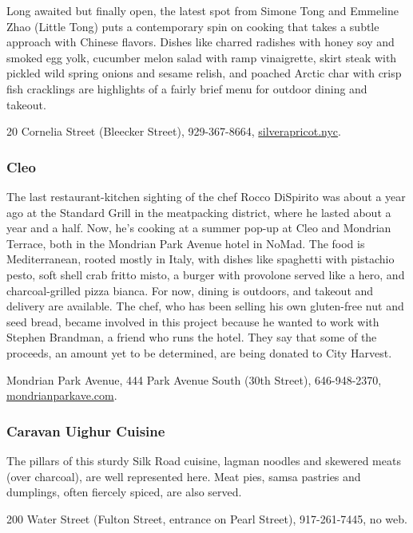 Long awaited but finally open, the latest spot from Simone Tong and
Emmeline Zhao (Little Tong) puts a contemporary spin on cooking that
takes a subtle approach with Chinese flavors. Dishes like charred
radishes with honey soy and smoked egg yolk, cucumber melon salad with
ramp vinaigrette, skirt steak with pickled wild spring onions and sesame
relish, and poached Arctic char with crisp fish cracklings are
highlights of a fairly brief menu for outdoor dining and takeout.

20 Cornelia Street (Bleecker Street), 929-367-8664,
\href{https://www.silverapricot.nyc/}{silverapricot.nyc}.

\hypertarget{cleo}{%
\subsubsection{Cleo}\label{cleo}}

The last restaurant-kitchen sighting of the chef Rocco DiSpirito was
about a year ago at the Standard Grill in the meatpacking district,
where he lasted about a year and a half. Now, he's cooking at a summer
pop-up at Cleo and Mondrian Terrace, both in the Mondrian Park Avenue
hotel in NoMad. The food is Mediterranean, rooted mostly in Italy, with
dishes like spaghetti with pistachio pesto, soft shell crab fritto
misto, a burger with provolone served like a hero, and charcoal-grilled
pizza bianca. For now, dining is outdoors, and takeout and delivery are
available. The chef, who has been selling his own gluten-free nut and
seed bread, became involved in this project because he wanted to work
with Stephen Brandman, a friend who runs the hotel. They say that some
of the proceeds, an amount yet to be determined, are being donated to
City Harvest.

Mondrian Park Avenue, 444 Park Avenue South (30th Street), 646-948-2370,
\href{http://www.mondrianparkave.com/}{mondrianparkave.com}.

\hypertarget{caravan-uighur-cuisine-}{%
\subsubsection{Caravan Uighur Cuisine }\label{caravan-uighur-cuisine-}}

The pillars of this sturdy Silk Road cuisine, lagman noodles and
skewered meats (over charcoal), are well represented here. Meat pies,
samsa pastries and dumplings, often fiercely spiced, are also served.

200 Water Street (Fulton Street, entrance on Pearl Street),
917-261-7445, no web.

